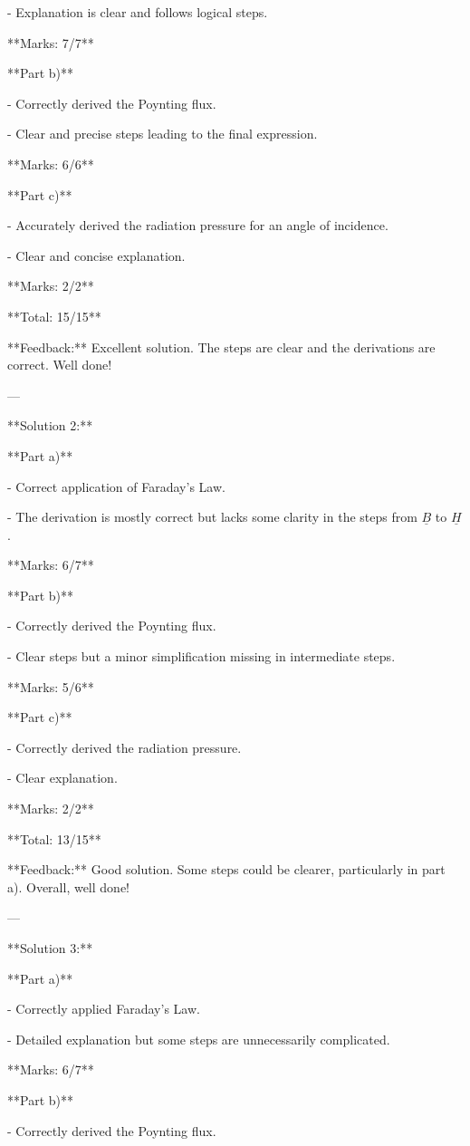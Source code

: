 \documentclass[a4paper,11pt]{article}
\begin{document}
- Explanation is clear and follows logical steps.

**Marks: 7/7**

**Part b)**

- Correctly derived the Poynting flux.

- Clear and precise steps leading to the final expression.

**Marks: 6/6**

**Part c)**

- Accurately derived the radiation pressure for an angle of incidence.

- Clear and concise explanation.

**Marks: 2/2**

**Total: 15/15**

**Feedback:** Excellent solution. The steps are clear and the derivations are correct. Well done!

---

**Solution 2:**

**Part a)**

- Correct application of Faraday's Law.

- The derivation is mostly correct but lacks some clarity in the steps from \( \underline{B} \) to \( \underline{H} \).

**Marks: 6/7**

**Part b)**

- Correctly derived the Poynting flux.

- Clear steps but a minor simplification missing in intermediate steps.

**Marks: 5/6**

**Part c)**

- Correctly derived the radiation pressure.

- Clear explanation.

**Marks: 2/2**

**Total: 13/15**

**Feedback:** Good solution. Some steps could be clearer, particularly in part a). Overall, well done!

---

**Solution 3:**

**Part a)**

- Correctly applied Faraday's Law.

- Detailed explanation but some steps are unnecessarily complicated.

**Marks: 6/7**

**Part b)**

- Correctly derived the Poynting flux.
\end{document}
